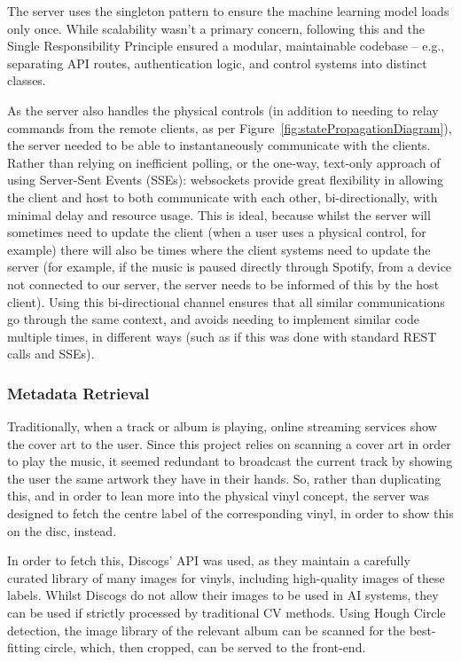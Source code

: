             The server uses the singleton pattern to ensure the machine learning model loads only once. While scalability wasn't a primary concern, following this and the Single Responsibility Principle ensured a modular, maintainable codebase -- e.g., separating API routes, authentication logic, and control systems into distinct classes.
    
            As the server also handles the physical controls (in addition to needing to relay commands from the remote clients, as per Figure~\ref{fig:statePropagationDiagram}), the server needed to be able to instantaneously communicate with the clients. Rather than relying on inefficient polling, or the one-way, text-only approach of using Server-Sent Events (SSEs): websockets provide great flexibility in allowing the client and host to both communicate with each other, bi-directionally, with minimal delay and resource usage. This is ideal, because whilst the server will sometimes need to update the client (when a user uses a physical control, for example) there will also be times where the client systems need to update the server (for example, if the music is paused directly through Spotify, from a device not connected to our server, the server needs to be informed of this by the host client). Using this bi-directional channel ensures that all similar communications go through the same context, and avoids needing to implement similar code multiple times, in different ways (such as if this was done with standard REST calls and SSEs).
        
            \subsubsection{Metadata Retrieval}
    
                Traditionally, when a track or album is playing, online streaming services show the cover art to the user. Since this project relies on scanning a cover art in order to play the music, it seemed redundant to broadcast the current track by showing the user the same artwork they have in their hands. So, rather than duplicating this, and in order to lean more into the physical vinyl concept, the server was designed to fetch the centre label of the corresponding vinyl, in order to show this on the disc, instead.
    
                In order to fetch this, Discogs' API was used, as they maintain a carefully curated library of many images for vinyls, including high-quality images of these labels. Whilst Discogs do not allow their images to be used in AI systems, they can be used if strictly processed by traditional CV methods. Using Hough Circle detection, the image library of the relevant album can be scanned for the best-fitting circle, which, then cropped, can be served to the front-end.
          
